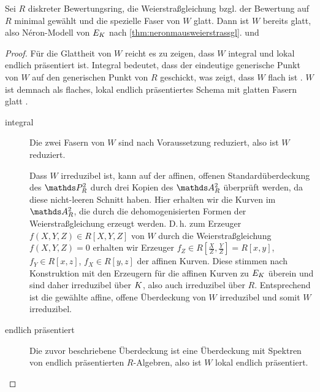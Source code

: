 \documentclass[german]{scrreprt}
\begin{document}
\begin{Korollar}
  Sei $R$ diskreter Bewertungsring, die Weierstraßgleichung
  bzgl. der Bewertung auf $R$ minimal gewählt und die spezielle Faser
  von $W$ glatt.
  Dann ist $W$ bereits glatt, also Néron-Modell von $E_{K}$ nach
  \autoref{thm:neronmausweierstrassgl}.
  \cite[Remark IV.5.4.1]{silverman2} und \cite[für die Definition von
  guter Reduktion][Chapter VII.5]{silverman}
  \begin{proof}
    Für die Glattheit von $W$ reicht es zu zeigen, dass $W$ integral
    und lokal endlich präsentiert ist.
    Integral bedeutet, dass der eindeutige generische Punkt von $W$
    auf den generischen Punkt von $R$ geschickt, was zeigt, dass $W$
    flach ist \cite[Proposition III.9.7]{hartshorne}.
    $W$ ist demnach als flaches, lokal endlich präsentiertes Schema mit
    glatten Fasern glatt \cite[8.5, Proposition 17]{bosch}.
    \begin{description}
    \item[integral]
      Die zwei Fasern von $W$ sind nach Voraussetzung reduziert, also
      ist $W$ reduziert.
      
      Dass $W$ irreduzibel ist, kann auf der affinen, offenen
      Standardüberdeckung des $\P_R^2$ durch drei Kopien des $\A_R^2$
      überprüft werden, da diese nicht-leeren Schnitt haben. Hier
      erhalten wir die Kurven im $\A_R^2$, die durch die
      dehomogenisierten Formen der Weierstraßgleichung erzeugt
      werden. D.\,h. zum Erzeuger $f(X,Y,Z)\in R[X,Y,Z]$ von $W$ durch 
      die Weierstraßgleichung $f(X,Y,Z)=0$  erhalten wir Erzeuger
      $f_Z\in R[\frac{X}{Z},\frac{Y}{Z}]=R[x,y]$, $f_Y\in R[x,z]$,
      $f_X\in R[y,z]$ der affinen Kurven.
      Diese stimmen nach Konstruktion mit den Erzeugern für die affinen
      Kurven zu $E_{K}$ überein und sind daher irreduzibel über $K$,
      also auch irreduzibel über $R$.
      Entsprechend ist die gewählte affine, offene Überdeckung von $W$
      irreduzibel und somit $W$ irreduzibel.
    \item[endlich präsentiert]
      Die zuvor beschriebene Überdeckung ist eine Überdeckung mit
      Spektren von endlich präsentierten $R$-Algebren,
      also ist $W$ lokal endlich präsentiert.
    \end{description}
  \end{proof}
\end{Korollar}
\end{document}

